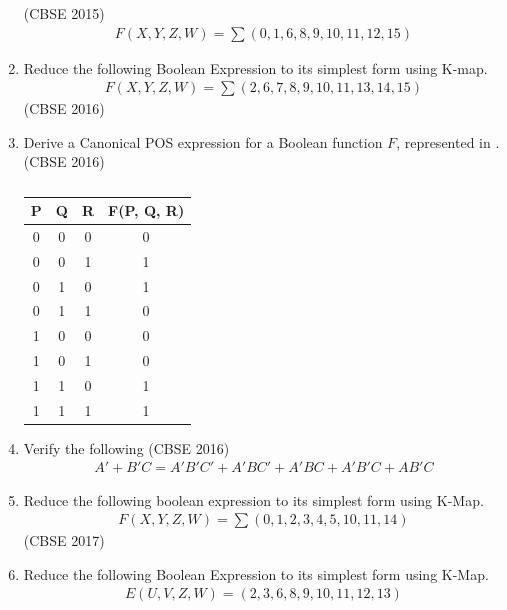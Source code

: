 \begin{enumerate}[label=\arabic*.,ref=\theenumi]
\hfill (CBSE 2015)
		\begin{align*}
F(X,Y,Z,W)= \sum (0,1,6,8,9,10,11,12,15)
		\end{align*}
	\item Reduce the following Boolean Expression to its simplest form using K-map.
\label{prob:2016/c/6/d}
		\begin{align*}
			F(X,Y,Z,W)= \sum(2,6,7,8,9,10,11,13,14,15)
		\end{align*}
\hfill (CBSE 2016)
	\item Derive a Canonical POS expression for a Boolean function  $F$, represented in 
.
\hfill (CBSE 2016)
\label{prob:2016/c/6/c}
		\begin{table}[H]
			\centering
			\begin{tabular}{|c|c|c|c|}
 \hline
 P & Q & R & F(P,  Q,  R) \\
 \hline
 0  & 0  & 0 & 0  \\
\hline
0  & 0  & 1 & 1  \\
\hline
0  & 1  & 0 & 1  \\
\hline
0  & 1  & 1 & 0  \\
\hline
1  & 0  & 0 & 0  \\
\hline
1  & 0  & 1 & 0  \\
\hline
1  & 1  & 0 & 1  \\
\hline
1  & 1  & 1 & 1  \\
\hline
\end{tabular}
			\caption{}
\label{tab:2016/c/6/c}
		\end{table}
	\item Verify the following 
\hfill (CBSE 2016)
\label{prob:2016/c/6/a}
		\begin{align*}
A'+B'C = A'B'C' + A'BC' + A'BC + A'B'C + AB'C
		\end{align*}
	\item Reduce the following boolean expression to its simplest form using K-Map.
\label{prob:2017-1/c/6/d}
		\begin{align*}
F(X,Y,Z,W) = \sum(0,1,2,3,4,5,10,11,14)
		\end{align*}
\hfill (CBSE 2017)
	\item
		Reduce the following Boolean Expression to its simplest form using K-Map.
\label{prob:2017/c/6/d}
		\begin{align*}
E(U,V,Z,W)=   (2 , 3 , 6 , 8 , 9 , 10 , 11 , 12 , 13 )
		\end{align*}

\end{enumerate}
